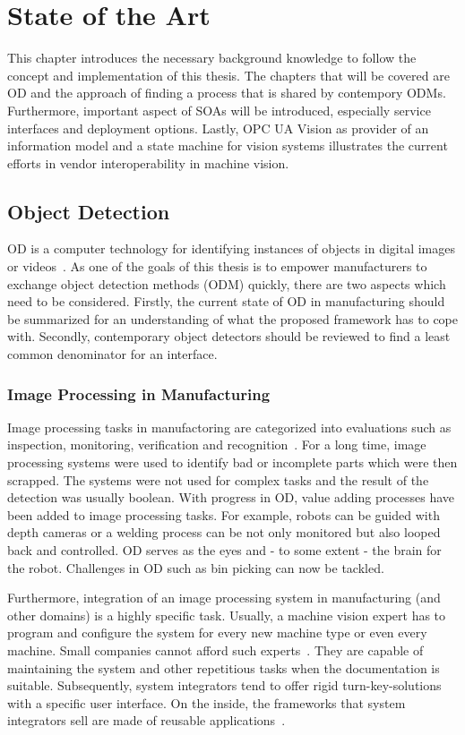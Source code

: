 \chapter{State of the Art\label{cha:chapter2}}
This chapter introduces the necessary background knowledge to follow the concept and implementation of this thesis. The chapters that will be covered are OD and the approach of finding a process that is shared by contempory ODMs. Furthermore, important aspect of SOAs will be introduced, especially service interfaces and deployment options. Lastly, OPC UA Vision as provider of an information model and a state machine for vision systems illustrates the current efforts in vendor interoperability in machine vision.

\section{Object Detection}
OD is a computer technology for identifying instances of objects in digital images or videos~\cite{Hornberg2007HandbookVision}. As one of the goals of this thesis is to empower manufacturers to exchange object detection methods (ODM) quickly, there are two aspects which need to be considered. Firstly, the current state of OD in manufacturing should be summarized for an understanding of what the proposed framework has to cope with. Secondly, contemporary object detectors should be reviewed to find a least common denominator for an interface.

\subsection{Image Processing in Manufacturing}
Image processing tasks in manufactoring are categorized into evaluations such as inspection, monitoring, verification and recognition~\cite{Hornberg2007HandbookVision}. For a long time, image processing systems were used to identify bad or incomplete parts which were then scrapped. The systems were not used for complex tasks and the result of the detection was usually boolean. With progress in OD, value adding processes have been added to image processing tasks. For example, robots can be guided with depth cameras or a welding process can be not only monitored but also looped back and controlled. OD serves as the eyes and - to some extent - the brain for the robot. Challenges in OD such as bin picking can now be tackled. 

Furthermore, integration of an image processing system in manufacturing (and other domains) is a highly specific task. Usually, a machine vision expert has to program and configure the system for every new machine type or even every machine. Small companies cannot afford such experts~\cite{Hornberg2007HandbookVision}. They are capable of maintaining the system and other repetitious tasks when the documentation is suitable. Subsequently, system integrators tend to offer rigid turn-key-solutions with a specific user interface. On the inside, the frameworks that system integrators sell are made of reusable applications~\cite{Hornberg2007HandbookVision}.

